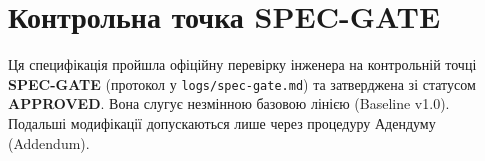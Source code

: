 \documentclass[12pt,a4paper]{article}
\begin{document}
\section{Контрольна точка SPEC-GATE}
Ця специфікація пройшла офіційну перевірку інженера на контрольній точці \textbf{SPEC-GATE} (протокол у \texttt{logs/spec-gate.md}) та затверджена зі статусом \textbf{APPROVED}. Вона слугує незмінною базовою лінією (Baseline v1.0). Подальші модифікації допускаються лише через процедуру Адендуму (Addendum).
\end{document}
